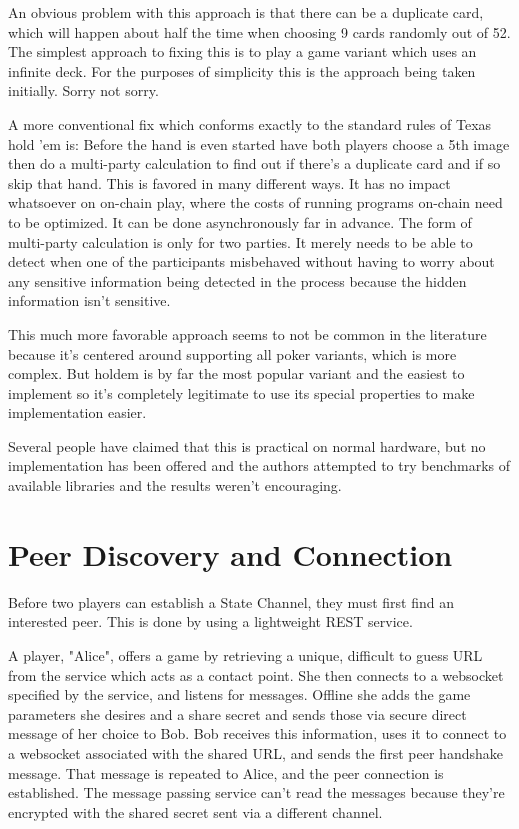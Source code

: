\documentclass[a4paper]{article}
\begin{document}
\begin{multicols}{2}
An obvious problem with this approach is that there can be a duplicate card, which will happen about half the time when choosing 9 cards randomly out of 52. The simplest approach to fixing this is to play a game variant which uses an infinite deck. For the purposes of simplicity this is the approach being taken initially. Sorry not sorry.

A more conventional fix which conforms exactly to the standard rules of Texas hold 'em is: Before the hand is even started have both players choose a 5th image then do a multi-party calculation to find out if there’s a duplicate card and if so skip that hand. This is favored in many different ways. It has no impact whatsoever on on-chain play, where the costs of running programs on-chain need to be optimized. It can be done asynchronously far in advance. The form of multi-party calculation is only for two parties. It merely needs to be able to detect when one of the participants misbehaved without having to worry about any sensitive information being detected in the process because the hidden information isn’t sensitive. 

This much more favorable approach seems to not be common in the literature because it’s centered around supporting all poker variants, which is more complex. But holdem is by far the most popular variant and the easiest to implement so it’s completely legitimate to use its special properties to make implementation easier.

Several people have claimed that this is practical on normal hardware, but no implementation has been offered and the authors attempted to try benchmarks of available libraries and the results weren’t encouraging.


\section{Peer Discovery and Connection}

Before two players can establish a State Channel, they must first find an interested peer. This is done by using a lightweight REST service.

A player, "Alice", offers a game by retrieving a unique, difficult to guess URL from the service which acts as a contact point. She then connects to a websocket specified by the service, and listens for messages. Offline she adds the game parameters she desires and a share secret and sends those via secure direct message of her choice to Bob. Bob receives this information, uses it to connect to a websocket associated with the shared URL, and sends the first peer handshake message. That message is repeated to Alice, and the peer connection is established. The message passing service can’t read the messages because they’re encrypted with the shared secret sent via a different channel.



\end{multicols}
\end{document}
